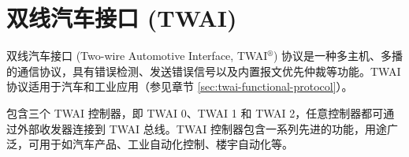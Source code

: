 \documentclass[main\_\_CN.tex]{subfiles}
\begin{document}

\ifglobal
\else
    {\let\clearpage\relax \listoftodos}
    {\let\clearpage\relax \listofdonetodos}
    \tableofcontents
\fi




\hypertarget{twai}{}
\chapter{双线汽车接口 (TWAI)}
\label{mod:twai}

双线汽车接口 (Two-wire Automotive Interface, TWAI$^\circledR$) 协议是一种多主机、多播的通信协议，具有错误检测、发送错误信号以及内置报文优先仲裁等功能。TWAI 协议适用于汽车和工业应用（参见章节 \ref{sec:twai-functional-protocol}）。

\chipname{} 包含三个 TWAI 控制器，即 TWAI 0、TWAI 1 和 TWAI 2，任意控制器都可通过外部收发器连接到 TWAI 总线。TWAI 控制器包含一系列先进的功能，用途广泛，可用于如汽车产品、工业自动化控制、楼宇自动化等。
\end{document}

